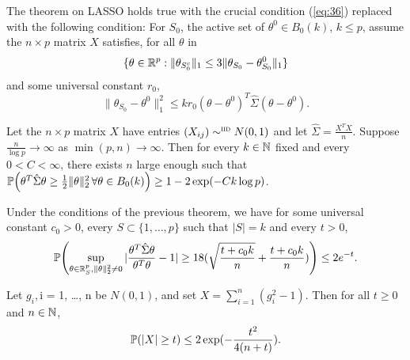 \begin{thm}
  The theorem on LASSO holds true with the crucial condition
  (\ref{eq:36}) replaced with the following condition: For $S_{0}$,
  the active set of $\theta^{0} \in B_{0}(k)$, $k \leq p$, assume the
  $n \times p$ matrix $X$ satisfies, for all $\theta$ in
  \begin{equation}
    \label{eq:37}
    \{ \theta \in \mathbb{R}^{p} : \| \theta_{S_{0}^{c}} \|_{1} \leq 3 \|
    \theta_{S_{0}} - \theta_{S_{0}}^{0} \|_{1} \}
  \end{equation} and some universal constant $r_{0}$,
  \begin{equation}
    \label{eq:38}
    \| \theta_{S_{0}} - \theta^{0} \|_{1}^{2} \leq k r_{0} (\theta -
    \theta^{0})^{T} \hat \Sigma (\theta - \theta^{0}).
  \end{equation}
\end{thm}

\begin{thm}
  Let the $n \times p$ matrix $X$ have entries $(X_{ij}) \sim^{\textsc{iid}}
  N(0, 1)$  and let $\hat \Sigma = \frac{X^{T} X}{n}$.  Suppose
  $\frac{n}{\log p}  \rightarrow \infty$ as $\min(p, n) \rightarrow
  \infty$.  Then for every $k \in \mathbb{N}$ fixed and every $0 < C <
  \infty$, there exists $n$ large enough such that $\Prob{\theta^{T}
    \hat \Sigma \theta \geq \frac{1}{2} \| \theta \|_{2}^{2}\, \forall
  \theta \in B_{0}(k)} \geq 1 - 2 \exp(-Ck \log p)$.
\end{thm}

\begin{thm}
  Under the conditions of the previous theorem, we have for some
  universal constant $c_{0} > 0$, every $S \subset \{ 1, \dots, p \}$
  such that $|S| = k$ and every $t > 0$,
  \begin{equation}
    \label{eq:39}
    \Prob{\sup_{\theta \in \R^{p}_{S}, \| \theta \|_{2}^{2} \neq 0} |
      \frac{\theta^{T} \hat \Sigma \theta}{\theta^{T} \theta}  - 1 |
      \geq 18 (\sqrt{\frac{t + c_{0} k}{n}} + \frac{t + c_{0} k}{n} )
    } \leq 2 e^{-t}.
  \end{equation}
\end{thm}

\begin{thm}
  Let $g_{i}, $i = 1, \dots, n be \iid $N(0, 1)$, and set $X =
  \sum_{i=1}^{n} (g_{i}^{2} - 1)$.  Then for all $t \geq 0$ and $n \in
  \mathbb{N}$,
  \begin{equation}
    \label{eq:40}
    \Prob{|X| \geq t} \leq 2 \exp(-\frac{t^{2}}{4(n+t)}).
  \end{equation}
\end{thm}

